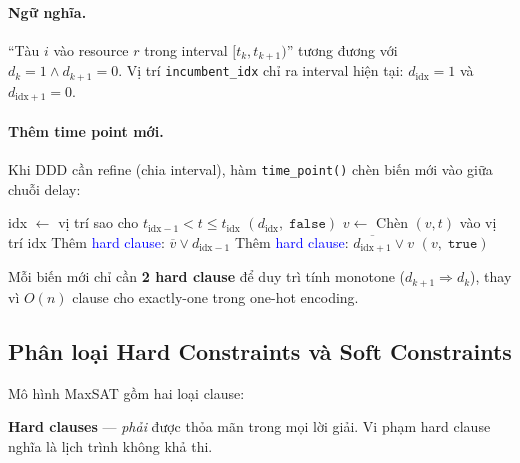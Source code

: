 \documentclass[11pt,a4paper]{article}
\begin{document}
\paragraph{Ngữ nghĩa.} ``Tàu $i$ vào resource $r$ trong interval $[t_k, t_{k+1})$'' tương đương với $d_k = 1 \wedge d_{k+1} = 0$. Vị trí \texttt{incumbent\_idx} chỉ ra interval hiện tại: $d_{\text{idx}} = 1$ và $d_{\text{idx}+1} = 0$.

\paragraph{Thêm time point mới.} Khi DDD cần refine (chia interval), hàm \texttt{time\_point()} chèn biến mới vào giữa chuỗi delay:

\begin{algorithm}[H]
\caption{Thêm time point $t$ vào chuỗi delay của visit}
\begin{algorithmic}[1]
  \State idx $\gets$ vị trí sao cho $t_{\text{idx}-1} < t \leq t_{\text{idx}}$
   \Return $(d_{\text{idx}},\; \texttt{false})$ 
  \EndIf
  \State $v \gets$ 
  \State Chèn $(v, t)$ vào vị trí idx
  \State Thêm \textcolor{blue}{hard clause}: $\overline{v} \vee d_{\text{idx}-1}$ 
  \State Thêm \textcolor{blue}{hard clause}: $\overline{d_{\text{idx}+1}} \vee v$ 
  \State \Return $(v,\; \texttt{true})$
\EndFunction
\end{algorithmic}
\end{algorithm}

\noindent
Mỗi biến mới chỉ cần \textbf{2 hard clause} để duy trì tính monotone ($d_{k+1} \Rightarrow d_k$), thay vì $O(n)$ clause cho exactly-one trong one-hot encoding.


\subsection{Phân loại Hard Constraints và Soft Constraints}
\label{sec:hard-soft}

Mô hình MaxSAT gồm hai loại clause:

\begin{hardbox}
\textbf{Hard clauses} --- \emph{phải} được thỏa mãn trong mọi lời giải. Vi phạm hard clause nghĩa là lịch trình không khả thi.
\end{hardbox}
\end{document}
